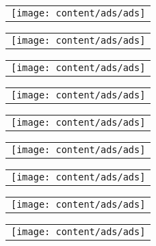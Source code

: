 \thispagestyle{empty}
\begin{center}\begin{tabular}{c} \texttt{[image: content/ads/ads]}\end{tabular}\end{center}

\begin{center}\begin{tabular}{c} \texttt{[image: content/ads/ads]}\end{tabular}\end{center}

\begin{center}\begin{tabular}{c} \texttt{[image: content/ads/ads]}\end{tabular}\end{center}

\begin{center}\begin{tabular}{c} \texttt{[image: content/ads/ads]}\end{tabular}\end{center}

\begin{center}\begin{tabular}{c} \texttt{[image: content/ads/ads]}\end{tabular}\end{center}

\begin{center}\begin{tabular}{c} \texttt{[image: content/ads/ads]}\end{tabular}\end{center}

\begin{center}\begin{tabular}{c} \texttt{[image: content/ads/ads]}\end{tabular}\end{center}

\begin{center}\begin{tabular}{c} \texttt{[image: content/ads/ads]}\end{tabular}\end{center}

\begin{center}\begin{tabular}{c} \texttt{[image: content/ads/ads]}\end{tabular}\end{center}
\clearpage

